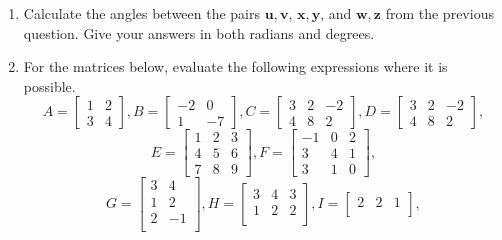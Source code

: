\documentclass[11pt,a4paper,titlepage,oneside,openany]{article}
\numberwithin{equation}{section}
\numberwithin{algorithm}{section}
\numberwithin{figure}{section}
\numberwithin{table}{section}
\renewcommand{\vec}[1]{\mathbf{#1}}
\begin{document}
\begin{enumerate}
\item
  Calculate the angles between the pairs $\vec{u},\vec{v}$, $\vec{x},\vec{y}$, and $\vec{w},\vec{z}$ from the previous question. Give your answers in both radians and degrees.

\item
  For the matrices below, evaluate the following expressions where it is possible.
  \begin{equation*}
    A=\left[ \begin{array}{cc} 1  & 2 \\ 3 & 4 \end{array}\right],
    B=\left[ \begin{array}{cc} -2  & 0 \\ 1 & -7 \end{array}\right],
    C=\left[ \begin{array}{ccc} 3  & 2 & -2 \\ 4 & 8 & 2 \end{array}\right],
    D=\left[ \begin{array}{ccc} 3  & 2 & -2 \\ 4 & 8 & 2 \end{array}\right],
  \end{equation*}
  \begin{equation*}
    E=\left[ \begin{array}{ccc} 1  & 2 & 3 \\ 4 & 5 & 6 \\ 7 & 8 & 9 \end{array}\right],
    F=\left[ \begin{array}{ccc} -1  & 0 & 2 \\ 3 & 4 & 1 \\  3 & 1 & 0 \end{array}\right],
  \end{equation*}
    \begin{equation*}
G=\left[ \begin{array}{cc}3 & 4 \\1 & 2 \\2 &-1 \\ \end{array}\right],
H=\left[ \begin{array}{ccc}3 & 4 & 3\\1 & 2 & 2\\ \end{array}\right],
I=\left[ \begin{array}{ccc}2 & 2 & 1\\ \end{array}\right],

\end{equation*}
\end{enumerate}
\end{document}
